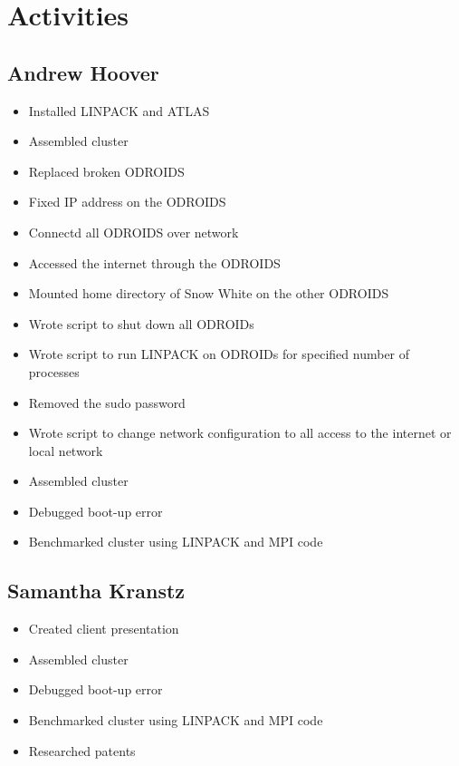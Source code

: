 \documentclass{article}
\begin{document}
\section*{Activities}

\subsection*{Andrew Hoover}
\begin{itemize}
	\item Installed LINPACK and ATLAS
	\item Assembled cluster
	\item Replaced broken ODROIDS
	\item Fixed IP address on the ODROIDS
	\item Connectd all ODROIDS over network
	\item Accessed the internet through the ODROIDS
	\item Mounted home directory of Snow White on the other ODROIDS
	\item Wrote script to shut down all ODROIDs
	\item Wrote script to run LINPACK on ODROIDs for specified number of processes
	\item Removed the sudo password
	\item Wrote script to change network configuration to all access to the internet or local network
	\item Assembled cluster
	\item Debugged boot-up error
	\item Benchmarked cluster using LINPACK and MPI code
\end{itemize}
\subsection*{Samantha Kranstz}
\begin{itemize}
	\item Created client presentation 
	\item Assembled cluster
	\item Debugged boot-up error
	\item Benchmarked cluster using LINPACK and MPI code
	\item Researched patents
\end{itemize}
\end{document}
